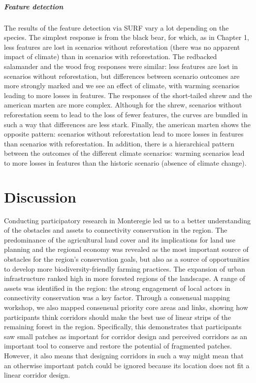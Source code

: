 {\subparagraph*{\textit{Feature detection}} The results of the feature detection via SURF vary a lot depending on the species. The simplest response is from the black bear, for which, as in Chapter 1, less features are lost in scenarios without reforestation (there was no apparent impact of climate) than in scenarios with reforestation. The redbacked salamander and the wood frog responses were similar: less features are lost in scenarios without reforestation, but differences between scenario outcomes are more strongly marked and we see an effect of climate, with warming scenarios leading to more losses in features. The responses of the short-tailed shrew and the american marten are more complex. Although for the shrew, scenarios without reforestation seem to lead to the loss of fewer features, the curves are bundled in such a way that differences are less stark. Finally, the american marten shows the opposite pattern: scenarios without reforestation lead to more losses in features than scenarios with reforestation. In addition, there is a hierarchical pattern between the outcomes of the different climate scenarios: warming scenarios lead to more losses in features than the historic scenario (absence of climate change).\\

\section{Discussion}

Conducting participatory research in Monteregie led us to a better understanding of the obstacles and assets to connectivity conservation in the region. The predominance of the agricultural land cover and its implications for land use planning and the regional economy was revealed as the most important source of obstacles for the region’s conservation goals, but also as a source of opportunities to develop more biodiversity-friendly farming practices. The expansion of urban infrastructure ranked high in more forested regions of the landscape. A range of assets was identified in the region: the strong engagement of local actors in connectivity conservation was a key factor. Through a consensual mapping workshop, we also mapped consensual priority core areas and links, showing how participants think corridors should make the best use of linear strips of the remaining forest in the region. Specifically, this demonstrates that participants saw small patches as important for corridor design and perceived corridors as an important tool to conserve and restore the potential of fragmented patches. However, it also means that designing corridors in such a way might mean that an otherwise important patch could be ignored because its location does not fit a linear corridor design. 

}

